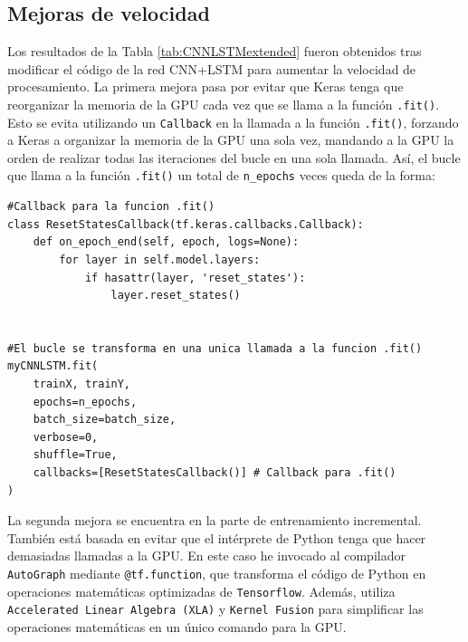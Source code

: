 \documentclass{article}
\begin{document}
\subsection{Mejoras de velocidad}
Los resultados de la Tabla \ref{tab:CNNLSTMextended} fueron obtenidos tras modificar el código de la red CNN+LSTM para aumentar la velocidad de procesamiento. La primera mejora pasa por evitar que Keras tenga que reorganizar la memoria de la GPU cada vez que se llama a la función \texttt{.fit()}. Esto se evita utilizando un \texttt{Callback} en la llamada a la función \texttt{.fit()}, forzando a Keras a organizar la memoria de la GPU una sola vez, mandando a la GPU la orden de realizar todas las iteraciones del bucle en una sola llamada. Así, el bucle que llama a la función \texttt{.fit()} un total de \texttt{n\_epochs} veces queda de la forma:

\begin{lstlisting}[style=pythonstyle, caption={\texttt{Callback} para la función \texttt{.fit()}}]
#Callback para la funcion .fit()
class ResetStatesCallback(tf.keras.callbacks.Callback):
	def on_epoch_end(self, epoch, logs=None):
		for layer in self.model.layers:
			if hasattr(layer, 'reset_states'):
				layer.reset_states()


#El bucle se transforma en una unica llamada a la funcion .fit()
myCNNLSTM.fit(
	trainX, trainY,
	epochs=n_epochs,
	batch_size=batch_size,
	verbose=0,
	shuffle=True,
	callbacks=[ResetStatesCallback()] # Callback para .fit()
)
\end{lstlisting}

La segunda mejora se encuentra en la parte de entrenamiento incremental. También está basada en evitar que el intérprete de Python tenga que hacer demasiadas llamadas a la GPU. En este caso he invocado al compilador \texttt{AutoGraph} mediante \texttt{@tf.function}, que transforma el código de Python en operaciones matemáticas optimizadas de \texttt{Tensorflow}. Además, utiliza \texttt{Accelerated Linear Algebra (XLA)} y \texttt{Kernel Fusion} para simplificar las operaciones matemáticas en un único comando para la GPU.
\end{document}
